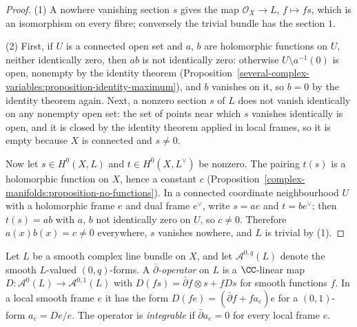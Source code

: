 \begin{proof}
(1) A nowhere vanishing section $s$ gives the map $\mathcal{O}_X \to L$, $f \mapsto fs$, which is an isomorphism on every fibre; conversely the trivial bundle has the section $1$.

(2) First, if $U$ is a connected open set and $a$, $b$ are holomorphic functions on $U$, neither identically zero, then $ab$ is not identically zero: otherwise $U \setminus a^{-1}(0)$ is open, nonempty by the identity
theorem (Proposition~\ref{several-complex-variables:proposition-identity-maximum}), and $b$ vanishes on it, so $b = 0$ by the identity theorem again. Next, a nonzero section $s$ of $L$ does not vanish identically on any
nonempty open set: the set of points near which $s$ vanishes identically is open, and it is closed by the identity theorem applied in local frames, so it is empty because $X$ is connected and $s \neq 0$.

Now let $s \in H^0(X, L)$ and $t \in H^0(X, L^\vee)$ be nonzero. The pairing $t(s)$ is a holomorphic function on $X$, hence a constant $c$ (Proposition~\ref{complex-manifolds:proposition-no-functions}). In a
connected coordinate neighbourhood $U$ with a holomorphic frame $e$ and dual frame $e^\vee$, write $s = ae$ and $t = be^\vee$; then $t(s) = ab$ with $a$, $b$ not identically zero on $U$, so $c \neq 0$. Therefore
$a(x)b(x) = c \neq 0$ everywhere, $s$ vanishes nowhere, and $L$ is trivial by (1).
\end{proof}

\begin{definition}\label{complex-manifolds:definition-dbar-operator}
Let $L$ be a smooth complex line bundle on $X$, and let $\mathcal{A}^{0,q}(L)$ denote the smooth $L$-valued $(0,q)$-forms. A \emph{$\bar\partial$-operator} on $L$ is a $\CC$-linear map
$D \colon \mathcal{A}^0(L) \to \mathcal{A}^{0,1}(L)$ with $D(fs) = \bar\partial f \otimes s + fDs$ for smooth functions $f$. In a local smooth frame $e$ it has the form $D(fe) = (\bar\partial f + fa_e)e$ for a
$(0,1)$-form $a_e = De/e$. The operator is \emph{integrable} if $\bar\partial a_e = 0$ for every local frame $e$.
\end{definition}


